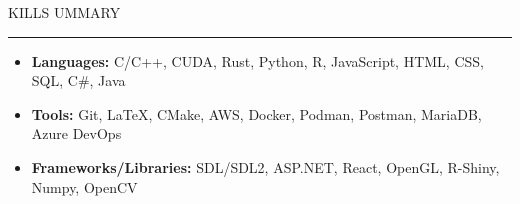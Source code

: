 \documentclass[11pt]{article}
\begin{document}
\par \scalebox{1.3}{S}KILLS \scalebox{1.3}{S}UMMARY                  
\par \vspace{-0.1in} \noindent\rule{7.8in}{0.5pt} 

\begin{itemize}
    \item \textbf{Languages:} \hspace*{3cm} C/C++, CUDA, Rust, Python, R, JavaScript, HTML, CSS, SQL, C\#, Java
    \item \textbf{Tools:} \hspace*{4cm} Git, \LaTeX, CMake, AWS, Docker, Podman, Postman, MariaDB, Azure DevOps
    \item \textbf{Frameworks/Libraries:} \hspace*{0.9cm}SDL/SDL2, ASP.NET, React, OpenGL, R-Shiny, Numpy, OpenCV
\end{itemize}
\end{document}
